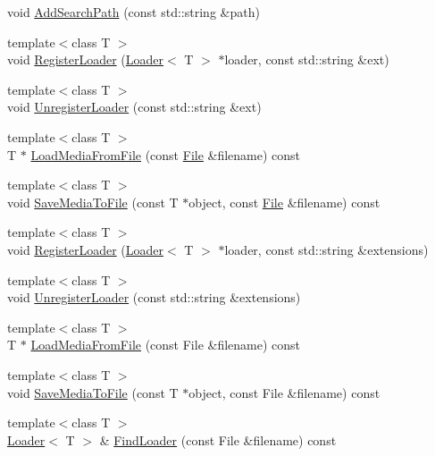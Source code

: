 \begin{DoxyCompactItemize}
\item 
void \hyperlink{class_agmd_1_1_media_manager_a7a4ae5891301a5feeabe562bc090f3aa}{Add\+Search\+Path} (const std\+::string \&path)
\item 
{\footnotesize template$<$class T $>$ }\\void \hyperlink{class_agmd_1_1_media_manager_a3304ce9c6606b20e4580ac5f0207f0f6}{Register\+Loader} (\hyperlink{class_agmd_1_1_loader}{Loader}$<$ T $>$ $\ast$loader, const std\+::string \&ext)
\item 
{\footnotesize template$<$class T $>$ }\\void \hyperlink{class_agmd_1_1_media_manager_afaeb845bca3c51e343b1c876d8bb2206}{Unregister\+Loader} (const std\+::string \&ext)
\item 
{\footnotesize template$<$class T $>$ }\\T $\ast$ \hyperlink{class_agmd_1_1_media_manager_ae4602b1d6e9800cf24b8338dbb6e50b8}{Load\+Media\+From\+File} (const \hyperlink{class_agmd_utilities_1_1_file}{File} \&filename) const 
\item 
{\footnotesize template$<$class T $>$ }\\void \hyperlink{class_agmd_1_1_media_manager_ab22eb919b859ef579579c581197e3cee}{Save\+Media\+To\+File} (const T $\ast$object, const \hyperlink{class_agmd_utilities_1_1_file}{File} \&filename) const 
\item 
{\footnotesize template$<$class T $>$ }\\void \hyperlink{class_agmd_1_1_media_manager_a9ba4f233ac1bef692d0a2673ca4b5ee4}{Register\+Loader} (\hyperlink{class_agmd_1_1_loader}{Loader}$<$ T $>$ $\ast$loader, const std\+::string \&extensions)
\item 
{\footnotesize template$<$class T $>$ }\\void \hyperlink{class_agmd_1_1_media_manager_a9a9c931457fcff02256b43a5ea10bc99}{Unregister\+Loader} (const std\+::string \&extensions)
\item 
{\footnotesize template$<$class T $>$ }\\T $\ast$ \hyperlink{class_agmd_1_1_media_manager_aebc8cb7b588f17f589430417fe68d56e}{Load\+Media\+From\+File} (const File \&filename) const 
\item 
{\footnotesize template$<$class T $>$ }\\void \hyperlink{class_agmd_1_1_media_manager_ab22eb919b859ef579579c581197e3cee}{Save\+Media\+To\+File} (const T $\ast$object, const File \&filename) const 
\item 
{\footnotesize template$<$class T $>$ }\\\hyperlink{class_agmd_1_1_loader}{Loader}$<$ T $>$ \& \hyperlink{class_agmd_1_1_media_manager_a137720775d2b24100276a2414e211378}{Find\+Loader} (const File \&filename) const 
\end{DoxyCompactItemize}
